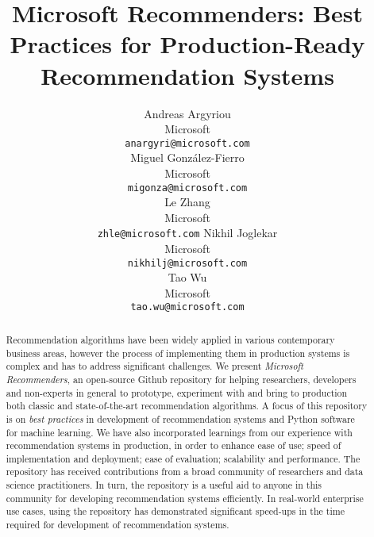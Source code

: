 \documentclass{article}
\title{Microsoft Recommenders: Best Practices for Production-Ready Recommendation Systems}
\author{%
  Andreas Argyriou \\
Microsoft \\ %
  \texttt{anargyri@microsoft.com} \\
\And
  Miguel Gonz{\'a}lez-Fierro \\
Microsoft \\ %
  \texttt{migonza@microsoft.com} \\
\And
  Le Zhang \\
Microsoft \\ %
  \texttt{zhle@microsoft.com} 
\And
  Nikhil Joglekar \\
Microsoft  \\ %
  \texttt{nikhilj@microsoft.com} \\
\And
  Tao Wu \\
Microsoft \\ %
  \texttt{tao.wu@microsoft.com} \\
}
\begin{document}
\maketitle

\begin{abstract}
Recommendation algorithms have been widely applied in various contemporary business areas, however the process of implementing them in production 
systems is complex and has to address significant challenges. We present {\em Microsoft Recommenders},  
an open-source Github repository for helping researchers, developers and non-experts in general to prototype, experiment with and
bring to production both classic and state-of-the-art recommendation algorithms.
A focus of this repository is on {\em best practices} in development of recommendation systems and Python software for machine learning.
We have also incorporated learnings from our experience with recommendation systems in production, in order to enhance ease of use; speed of 
implementation and deployment; ease of evaluation; scalability and performance. 
The repository has received contributions from a broad community of researchers and data science practitioners. 
In turn, the repository is a useful aid to anyone in this community for developing recommendation systems efficiently.
In real-world enterprise use cases, using the repository has demonstrated significant speed-ups in the time required for development of recommendation systems. 
\end{abstract}






%
%
% 
%
%
%














\end{document}
